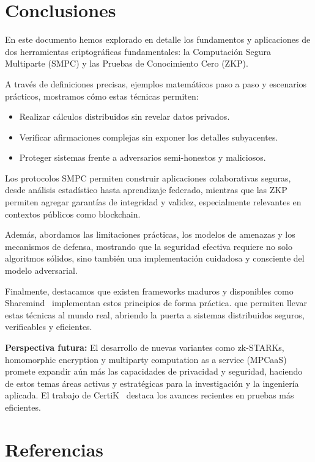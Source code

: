 \documentclass{article}
\begin{document}
\section{Conclusiones}

En este documento hemos explorado en detalle los fundamentos y aplicaciones de dos herramientas criptográficas fundamentales: la Computación Segura Multiparte (SMPC) y las Pruebas de Conocimiento Cero (ZKP). 

A través de definiciones precisas, ejemplos matemáticos paso a paso y escenarios prácticos, mostramos cómo estas técnicas permiten:
\begin{itemize}
    \item Realizar cálculos distribuidos sin revelar datos privados.
    \item Verificar afirmaciones complejas sin exponer los detalles subyacentes.
    \item Proteger sistemas frente a adversarios semi-honestos y maliciosos.
\end{itemize}

Los protocolos SMPC permiten construir aplicaciones colaborativas seguras, desde análisis estadístico hasta aprendizaje federado, mientras que las ZKP permiten agregar garantías de integridad y validez, especialmente relevantes en contextos públicos como blockchain.

Además, abordamos las limitaciones prácticas, los modelos de amenazas y los mecanismos de defensa, mostrando que la seguridad efectiva requiere no solo algoritmos sólidos, sino también una implementación cuidadosa y consciente del modelo adversarial.

Finalmente, destacamos que existen frameworks maduros y disponibles como Sharemind~\cite{bogdanov2008} implementan estos principios de forma práctica. que permiten llevar estas técnicas al mundo real, abriendo la puerta a sistemas distribuidos seguros, verificables y eficientes.

\textbf{Perspectiva futura:} 
El desarrollo de nuevas variantes como zk-STARKs, homomorphic encryption y multiparty computation as a service (MPCaaS) promete expandir aún más las capacidades de privacidad y seguridad, haciendo de estos temas áreas activas y estratégicas para la investigación y la ingeniería aplicada. El trabajo de CertiK~\cite{certik2023} destaca los avances recientes en pruebas más eficientes.

\section{Referencias}
\end{document}
